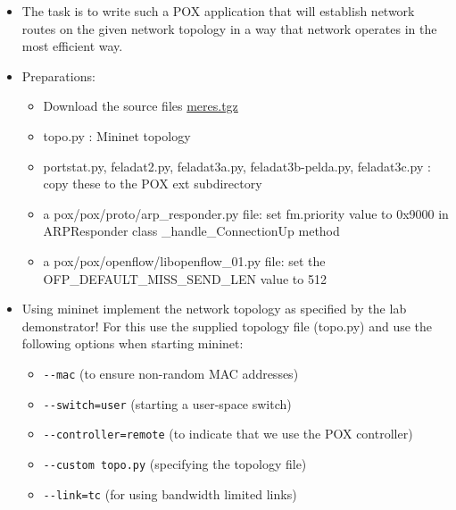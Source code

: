 \documentclass[a4paper]{article}
\begin{document}
\begin{itemize}
\item The task is to write such a POX application that will establish network routes on the given network topology in a way that network operates in the most
efficient way.
\item Preparations:
\begin{itemize}
\item        Download the source files \href{https://qosip.tmit.bme.hu/foswiki/pub/Meres/OpenFlowMScFeladatokPOX/meres.tgz}{meres.tgz}
\item        topo.py : Mininet topology
\item        portstat.py, feladat2.py, feladat3a.py, feladat3b-pelda.py, feladat3c.py : copy these to the POX ext subdirectory
\item        a pox/pox/proto/arp\_responder.py file: set fm.priority value to 0x9000 in ARPResponder class \_handle\_ConnectionUp method
\item        a pox/pox/openflow/libopenflow\_01.py file: set the OFP\_DEFAULT\_MISS\_SEND\_LEN value to 512 
\end{itemize}

\item Using mininet implement the network topology as specified by the lab demonstrator! For this use the supplied topology file (topo.py) and use the following
options when starting mininet:
\begin{itemize}
\item       \verb!--mac! (to ensure non-random MAC addresses)
\item       \verb!--switch=user! (starting a user-space switch)
\item       \verb!--controller=remote! (to indicate that we use the POX controller)
\item       \verb!--custom topo.py! (specifying the topology file)
\item       \verb!--link=tc! (for using bandwidth limited links)
\end{itemize}


\end{itemize}
\end{document}
